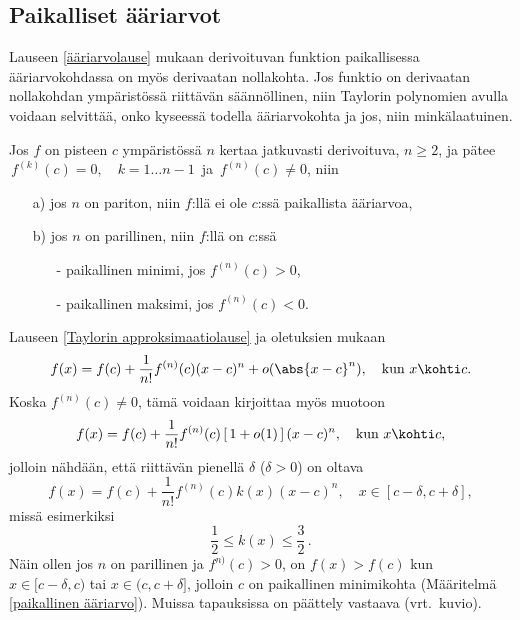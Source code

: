 \subsection{Paikalliset ääriarvot}

Lauseen \ref{ääriarvolause} mukaan derivoituvan funktion paikallisessa ääriarvokohdassa on
myös derivaatan nollakohta. Jos funktio on derivaatan nollakohdan ympäristössä riittävän 
säännöllinen, niin Taylorin polynomien avulla voidaan selvittää, onko kyseessä todella 
ääriarvokohta ja jos, niin minkälaatuinen.
\begin{Lause} \label{Taylorin ääriarvolause}
Jos $f$ on pisteen $c$ ympäristössä $n$ kertaa jatkuvasti derivoituva, $n\geq 2$, ja pätee
$\,f^{(k)}(c)=0,\quad k=1\ldots n-1\,$ ja $\,f^{(n)}(c)\neq 0$, niin
\begin{itemize}
\item[a)] jos $n$ on pariton, niin $f$:llä ei ole $c$:ssä paikallista ääriarvoa,
\item[b)] jos $n$ on parillinen, niin $f$:llä on $c$:ssä
\begin{itemize}
\item[-] paikallinen minimi, jos $f^{(n)}(c)>0$,
\item[-] paikallinen maksimi, jos $f^{(n)}(c)<0$.
\end{itemize}
\end{itemize}
\end{Lause}
\tod Lauseen \ref{Taylorin approksimaatiolause} ja oletuksien mukaan
\[
f(x)=f(c)+\frac{1}{n!}f^{(n)}(c)(x-c)^n+o(\abs{x-c}^n), \quad \text{kun}\ x \kohti c.
\]
Koska $f^{(n)}(c)\neq 0$, tämä voidaan kirjoittaa myös muotoon
\[
f(x)=f(c)+\frac{1}{n!}f^{(n)}(c)\,[\,1+o(1)\,]\,(x-c)^n, \quad \text{kun}\ x\kohti c,
\]
jolloin nähdään, että riittävän pienellä $\delta$ ($\delta>0$) on oltava
\[
f(x)=f(c)+\frac{1}{n!}f^{(n)}(c)k(x)(x-c)^n,\quad x\in [c-\delta,c+\delta],
\]
missä esimerkiksi
\[
\frac{1}{2}\leq k(x)\leq \frac{3}{2}\,.
\]
Näin ollen jos $n$ on parillinen ja $f^{n)}(c)>0$, on $f(x)>f(c)$ kun $x\in[c-\delta,c)$ tai
$x\in(c,c+\delta]$, jolloin $c$ on paikallinen minimikohta
(Määritelmä \ref{paikallinen ääriarvo}). Muissa tapauksissa on päättely vastaava
(vrt.\ kuvio). \loppu
